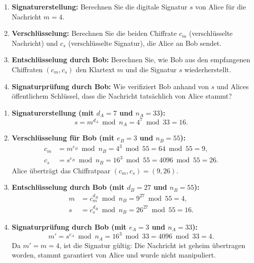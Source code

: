 \begin{myexercise}
	\begin{enumerate}
		\item \textbf{Signaturerstellung:} Berechnen Sie die digitale Signatur $s$ von Alice für die Nachricht $m = 4$.
		\item \textbf{Verschlüsselung:} Berechnen Sie die beiden Chiffrate $c_m$ (verschlüsselte Nachricht) und $c_s$ (verschlüsselte Signatur), die Alice an Bob sendet.
		\item \textbf{Entschlüsselung durch Bob:} Berechnen Sie, wie Bob aus den empfangenen Chiffraten $(c_m, c_s)$ den Klartext $m$ und die Signatur $s$ wiederherstellt.
		\item \textbf{Signaturprüfung durch Bob:} Wie verifiziert Bob anhand von $s$ und Alices öffentlichem Schlüssel, dass die Nachricht tatsächlich von Alice stammt?
	\end{enumerate}
	\begin{myanswer}
		\begin{enumerate}
			\item \textbf{Signaturerstellung (mit $d_A = 7$ und $n_A = 33$):}
			      \[
				      s = m^{d_A} \bmod n_A = 4^7 \bmod 33 = 16.
			      \]
			\item \textbf{Verschlüsselung für Bob (mit $e_B = 3$ und $n_B = 55$):}
			      \begin{align*}
				      c_m & = m^{e_B} \bmod n_B = 4^3 \bmod 55 = 64 \bmod 55 = 9, \\
				      c_s & = s^{e_B} \bmod n_B = 16^3 \bmod 55 = 4096 \bmod 55 = 26.
			      \end{align*}
			      Alice überträgt das Chiffratpaar $(c_m, c_s) = (9, 26)$.
			\item \textbf{Entschlüsselung durch Bob (mit $d_B = 27$ und $n_B = 55$):}
			      \begin{align*}
				      m & = c_m^{d_B} \bmod n_B = 9^{27} \bmod 55 = 4, \\
				      s & = c_s^{d_B} \bmod n_B = 26^{27} \bmod 55 = 16.
			      \end{align*}
			\item \textbf{Signaturprüfung durch Bob (mit $e_A = 3$ und $n_A = 33$):}
			      \[
				      m' = s^{e_A} \bmod n_A = 16^3 \bmod 33 = 4096 \bmod 33 = 4.
			      \]
			      Da $m' = m = 4$, ist die Signatur gültig: Die Nachricht ist geheim übertragen worden, stammt garantiert von Alice und wurde nicht manipuliert.
		\end{enumerate}

		
	\end{myanswer}
\end{myexercise}